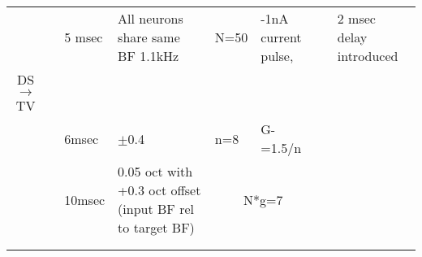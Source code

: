 \begin{longtable}{cXXXXXXX}
                                 &        \citep{PressnitzerMeddisEtAl:2001}        &                                                       5 msec                                                       &             All neurons share same BF 1.1kHz              &                   N=50                    &                                    {}-1nA current pulse,                                    &                                           & 2 msec delay introduced\\ 
  DS\ensuremath{\rightarrow}TV   &                                                  &                                                                                                                    &                                                           &                                           &                                                                                             &                                           & \\\midrule
                                 &           \citep{ErikssonRobert:1999}            &                                                       6msec                                                        &                         $\pm$0.4                          &                    n=8                    &                                          G-=1.5/n                                           &                                           & \\ 
                                 &             \citep{ReissYoung:2005}              &                                                       10msec                                                       & 0.05 oct with +0.3 oct offset (input BF rel to target BF) &                                                        \multicolumn{2}{c}{N*g=7}                                                        &                                           & \\ 
                                 &             \citep{DavisVoigt:1991}              &                                                                                                                    &                                                           &                                           &                                                                                             &                                           & \\ 
                                 &             \citep{DavisVoigt:1994}              &                                                                                                                    &                                                           &                                           &                                                                                             &                                           & \\ 

\end{longtable}
